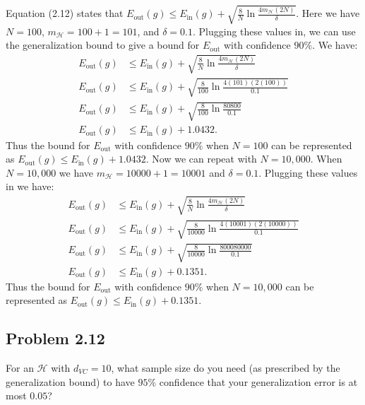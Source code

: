 \documentclass[a4paper]{article}
\begin{document}
Equation (2.12) states that $E_{\text{out}}(g) \leq E_{\text{in}}(g) + \sqrt{\frac{8}{N} \ln 
\frac{4m_{\mathcal{H}}(2N)}{\delta}}$.  Here we have $N = 100$, $m_{\mathcal{H}} = 100 + 1 = 101$, 
and $\delta = 0.1$.  Plugging these values in, we can use the generalization bound to give a bound 
for $E_{\text{out}}$ with confidence $90\%$.  We have:
\begin{align*}
    E_{\text{out}}(g) &\leq E_{\text{in}}(g) + \sqrt{\frac{8}{N} \ln \frac{4m_{\mathcal{H}}(2N)}
    {\delta}}\\
    E_{\text{out}}(g) &\leq E_{\text{in}}(g) + \sqrt{\frac{8}{100} \ln \frac{4(101)(2(100))}{0.1}}\\
    E_{\text{out}}(g) &\leq E_{\text{in}}(g) + \sqrt{\frac{8}{100} \ln \frac{80800}{0.1}}\\
    E_{\text{out}}(g) &\leq E_{\text{in}}(g) + 1.0432.
\end{align*}
Thus the bound for $E_{\text{out}}$ with confidence $90\%$ when $N = 100$ can be represented as 
$E_{\text{out}}(g) \leq E_{\text{in}}(g) + 1.0432$.  Now we can repeat with $N = 10,000$.  When 
$N = 10,000$ we have $m_{\mathcal{H}} = 10000 + 1 = 10001$ and $\delta = 0.1$.  Plugging these 
values in we have:
\begin{align*}
    E_{\text{out}}(g) &\leq E_{\text{in}}(g) + \sqrt{\frac{8}{N} \ln \frac{4m_{\mathcal{H}}(2N)}
    {\delta}}\\
    E_{\text{out}}(g) &\leq E_{\text{in}}(g) + \sqrt{\frac{8}{10000} \ln \frac{4(10001)(2(10000))}
    {0.1}}\\
    E_{\text{out}}(g) &\leq E_{\text{in}}(g) + \sqrt{\frac{8}{10000} \ln \frac{800080000}{0.1}}\\
    E_{\text{out}}(g) &\leq E_{\text{in}}(g) + 0.1351.
\end{align*}
Thus the bound for $E_{\text{out}}$ with confidence $90\%$  when $N = 10,000$ can be represented 
as $E_{\text{out}}(g) \leq E_{\text{in}}(g) + 0.1351$.


\subsection{Problem 2.12} For an $\mathcal{H}$ with $d_{VC} = 10$, what sample size do you 
need (as prescribed by the generalization bound) to have $95\%$ confidence that your 
generalization error is at most $0.05$?
\end{document}
